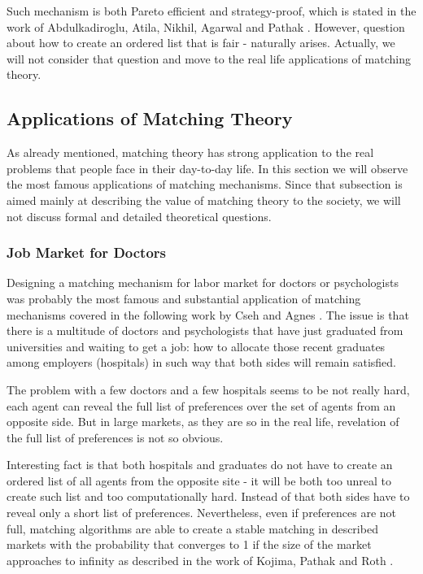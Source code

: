 \documentclass[a4paper]{article} %
\begin{document}
\hfill
\break
Such mechanism is both Pareto efficient and strategy-proof, which is stated in the work of Abdulkadiroglu, Atila, Nikhil, Agarwal and Pathak \cite{AmericanEconomicAssociation}. However, question about how to create an ordered list that is fair - naturally arises. Actually, we will not consider that question and move to the real life applications of matching theory.












\subsection{Applications of Matching Theory}

As already mentioned, matching theory has strong application to the real problems that people face in their day-to-day life. In this section we will observe the most famous applications of matching mechanisms. Since that subsection is aimed mainly at describing the value of matching theory to the society, we will not discuss formal and detailed theoretical questions.

\subsubsection{Job Market for Doctors}
Designing a matching mechanism for labor market for doctors or psychologists was probably the most famous and substantial application of matching mechanisms covered in the following work by Cseh and Agnes \cite{Complexity}. The issue is that there is a multitude of doctors and psychologists that have just graduated from universities and waiting to get a job: how to allocate those recent graduates among employers (hospitals) in such way that both sides will remain satisfied.

\hfill
\break
The problem with a few doctors and a few hospitals seems to be not really hard, each agent can reveal the full list of preferences over the set of agents from an opposite side. But in large markets, as they are so in the real life, revelation of the full list of preferences is not so obvious.


\hfill
\break
Interesting fact is that both hospitals and graduates do not have to create an ordered list of all agents from the opposite site - it will be both too unreal to create such list and too computationally hard. Instead of that both sides have to reveal only a short list of preferences. Nevertheless, even if preferences are not full, matching algorithms are able to create a stable matching in described markets with the probability that converges to 1 if the size of the market approaches to infinity as described in the work of Kojima, Pathak and Roth \cite{CouplesMatching}.
\end{document}
